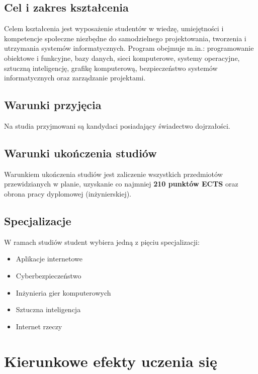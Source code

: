 \documentclass[12pt,a4paper]{article}
\begin{document}
\subsection{Cel i zakres kształcenia}

Celem kształcenia jest wyposażenie studentów w wiedzę, umiejętności i kompetencje społeczne niezbędne do samodzielnego projektowania, tworzenia i utrzymania systemów informatycznych. Program obejmuje m.in.: programowanie obiektowe i funkcyjne, bazy danych, sieci komputerowe, systemy operacyjne, sztuczną inteligencję, grafikę komputerową, bezpieczeństwo systemów informatycznych oraz zarządzanie projektami.

\subsection{Warunki przyjęcia}

Na studia przyjmowani są kandydaci posiadający świadectwo dojrzałości.

\subsection{Warunki ukończenia studiów}

Warunkiem ukończenia studiów jest zaliczenie wszystkich przedmiotów przewidzianych w planie, uzyskanie co najmniej \textbf{210 punktów ECTS} oraz obrona pracy dyplomowej (inżynierskiej).

\subsection{Specjalizacje}

W ramach studiów student wybiera jedną z pięciu specjalizacji:
\begin{itemize}
  \item Aplikacje internetowe
  \item Cyberbezpieczeństwo
  \item Inżynieria gier komputerowych
  \item Sztuczna inteligencja
  \item Internet rzeczy
\end{itemize}

\newpage

\section{Kierunkowe efekty uczenia się}
\end{document}

